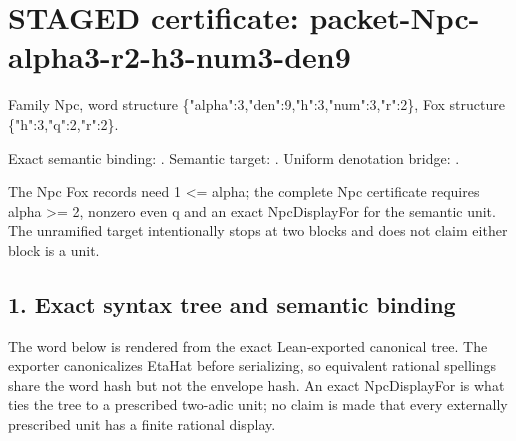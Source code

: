 \section*{STAGED certificate: packet-Npc-alpha3-r2-h3-num3-den9}
Family Npc, word structure \{"alpha":3,"den":9,"h":3,"num":3,"r":2\}, Fox structure \{"h":3,"q":2,"r":2\}.

\noindent Exact semantic binding: . Semantic target: . Uniform denotation bridge: .
\par\noindent The Npc Fox records need 1 <= alpha; the complete Npc certificate requires alpha >= 2, nonzero even q and an exact NpcDisplayFor for the semantic unit. The unramified target intentionally stops at two blocks and does not claim either block is a unit.

\subsection*{1. Exact syntax tree and semantic binding}
The word below is rendered from the exact Lean-exported canonical tree. The exporter canonicalizes EtaHat before serializing, so equivalent rational spellings share the word hash but not the envelope hash. An exact NpcDisplayFor is what ties the tree to a prescribed two-adic unit; no claim is made that every externally prescribed unit has a finite rational display.

